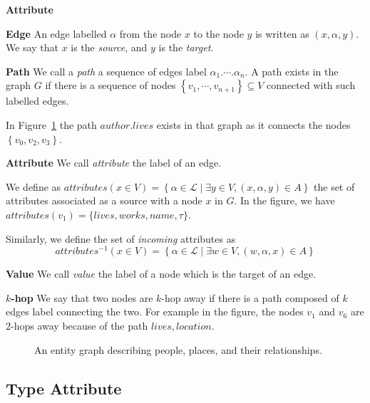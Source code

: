 \begin{labeling}{\textbf{Attribute}}
	\item[\textbf{Edge}] An edge labelled $\alpha$ from the node $x$ to the node $y$ is written as $\left(x, \alpha, y\right)$. We say that $x$ is the \emph{source}, and $y$ is the \emph{target}.

	\item[\textbf{Path}] We call a \emph{path} a sequence of edges label $\alpha_1.\cdots.\alpha_n$. A path exists in the graph $G$ if there is a sequence of nodes $\left\lbrace v_1, \cdots, v_{n+1} \right\rbrace \subseteq V$ connected with such labelled edges.

	In Figure~\ref{fig:graph} the path $author.lives$ exists in that graph as it connects the nodes $\left\lbrace v_0, v_2, v_3 \right\rbrace$.

	\item[\textbf{Attribute}] We call \emph{attribute} the label of an edge.

		We define as $attributes\left(x \in V\right) = \left\lbrace \alpha \in \mathcal{L} \mid \exists y \in V, (x, \alpha, y) \in A \right\rbrace$ the set of attributes associated as a source with a node $x$ in $G$. In the figure, we have $attributes(v_1) = \{lives,works,name,\tau\}$.

	Similarly, we define the set of \emph{incoming} attributes as
	$$
	attributes^{-1}\left(x \in V\right) = \left\lbrace \alpha \in \mathcal{L} \mid \exists w \in V, (w, \alpha, x) \in A \right\rbrace
	$$
	\item[\textbf{Value}] We call \emph{value} the label of a node which is the target of an edge.

	\item[\textbf{$k$-hop}] We say that two nodes are $k$-hop away if there is a path composed of $k$ edges label connecting the two. For example in the figure, the nodes $v_1$ and $v_6$ are 2-hops away because of the path $lives, location$.
\end{labeling}

\begin{figure}
	\centering
	\resizebox{\textwidth}{!}{
		
	}
	\caption{An entity graph describing people, places, and their relationships.}
	\label{fig:graph}
\end{figure}

\subsection{Type Attribute}
\label{sec:ssd:type}

